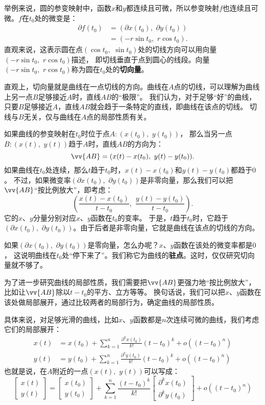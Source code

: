 \documentclass[12pt,UTF8]{ctexbook}
\newcommand{\olim}[1]{\mathit{o}\left(#1\right)}  %
\theoremstyle{definition}
\theoremstyle{plain}
\begin{document}
举例来说，圆的参变映射中，函数$x$和$y$都连续且可微，所以参变映射$f$也连续且可微。$f$在$t_0$处的微变是：
\begin{align*}
    \partial f(t_0) &= (\partial x(t_0),\,\,\partial y(t_0)) \\
    &= (-r\sin{t_0},\,\, r\cos{t_0}).
\end{align*}
直观来说，这表示圆在点$(\cos{t_0},\,\,\sin{t_0})$处的切线方向可以用向量$(-r\sin{t_0},\,\, r\cos{t_0})$描述，
即切线垂直于点到圆心的线段。向量$(-r\sin{t_0},\,\, r\cos{t_0})$称为圆在$t_0$处的\textbf{切向量}。

直观上，切向量就是曲线在一点切线的方向。曲线在$A$点的切线，可以理解为曲线上另一点$B$足够接近$A$时，直线$AB$的“极限”。
我们认为，对于足够“好”的曲线，只要$B$足够接近$A$，直线$AB$就会趋于一条特定的直线，即曲线在该点的切线。
切线与$B$无关，仅与曲线在$A$点的局部性质有关。

如果曲线的参变映射在$t_0$时位于点$A:(x(t_0),\,\, y(t_0))$，
那么当另一点$B:(x(t),\,\, y(t))$趋于$A$时，直线$AB$的方向为：
$$ \vv{AB} = (x(t) - x(t_0),\,\, y(t) - y(t_0)). $$
如果曲线在$t_0$处连续，那么$t$趋于$t_0$时，$x(t) - x(t_0)$和$y(t) - y(t_0)$都趋于$0$。
不过，如果微变率$(\partial x(t_0),\,\,\partial y(t_0))$是非零向量，那么我们可以把$\vv{AB}$“按比例放大”，即考虑：
$$ \left(\frac{x(t) - x(t_0)}{t - t_0},\,\, \frac{y(t) - y(t_0)}{t - t_0}\right).$$
它的$x$、$y$分量分别对应$x$、$y$函数在$t_0$的变率。
于是，$t$趋于$t_0$时，它趋于$(\partial x(t_0),\,\,\partial y(t_0))$。由于后者是非零向量，它就是曲线在该点的切线的方向。

如果$(\partial x(t_0),\,\,\partial y(t_0))$是零向量，怎么办呢？$x$、$y$函数在该处的微变率都是$0$，
这说明曲线在$t_0$处“停下来了”。我们称它为曲线的\textbf{驻点}。这时，仅仅研究切向量就不够了。

为了进一步研究曲线的局部性质，我们需要把$\vv{AB}$更强力地“按比例放大”，比如让$\vv{AB}$除以$t - t_0$的平方、立方等等。
换句话说，我们可以把$x$、$y$函数在该处做局部展开，通过比较两者的局部行为，确定曲线的局部性质。

具体来说，对足够光滑的曲线，比如$x$、$y$函数都是$n$次连续可微的曲线，我们考虑它们的局部展开：
\begin{align*}
    x(t) &= x(t_0) + \sum_{k=1}^n \frac{\partial^k x (t_0)}{k!}(t - t_0)^k + \olim{(t - t_0)^n} \\
    y(t) &= y(t_0) + \sum_{k=1}^n \frac{\partial^k y (t_0)}{k!}(t - t_0)^k + \olim{(t - t_0)^n}
\end{align*}
也就是说，在$A$附近的一点$(x(t),\,\, y(t))$可以写成：
$$
\begin{bmatrix}
    x(t) \\ y(t)
\end{bmatrix}
=
\begin{bmatrix}
    x(t_0) \\ y(t_0)
\end{bmatrix}
+
\sum_{k=1}^n \frac{(t - t_0)^k}{k!}
\begin{bmatrix}
    \partial^k x(t_0) \\ \partial^k y(t_0)
\end{bmatrix}
+
\olim{(t - t_0)^n}
$$
\end{document}
